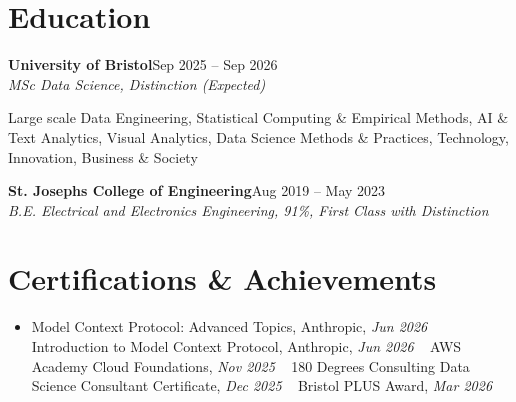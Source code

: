 \documentclass[a4paper,11pt]{article}
\newcommand{\roleNoLoc}[3]{%
  \textbf{#1}\hfill{\color{muted}#2}\\
  \textit{#3}\par}
\newcommand{\gap}{\vspace{5pt}}
\begin{document}
\section{Education}
\roleNoLoc{University of Bristol}{Sep 2025 – Sep 2026}{MSc Data Science, Distinction \textit{(Expected)}}
{\color{muted}\small Large scale Data Engineering, Statistical Computing \& Empirical Methods, AI \& Text Analytics, Visual Analytics, Data Science Methods \& Practices, Technology, Innovation, Business \& Society}\par
\gap
{}
\roleNoLoc{St. Joseph\textquotesingle{}s College of Engineering}{Aug 2019 – May 2023}{B.E. Electrical and Electronics Engineering, 91\%, First Class with Distinction}

\section{Certifications \& Achievements}
\begin{itemize}
  \item Model Context Protocol: Advanced Topics, Anthropic, \textit{Jun 2026}\nobreak\ \,\textperiodcentered\, Introduction to Model Context Protocol, Anthropic, \textit{Jun 2026}\nobreak\ \,\textperiodcentered\, AWS Academy Cloud Foundations, \textit{Nov 2025}\nobreak\ \,\textperiodcentered\, 180 Degrees Consulting Data Science Consultant Certificate, \textit{Dec 2025}\nobreak\ \,\textperiodcentered\, Bristol PLUS Award, \textit{Mar 2026}
\end{itemize}
\end{document}
